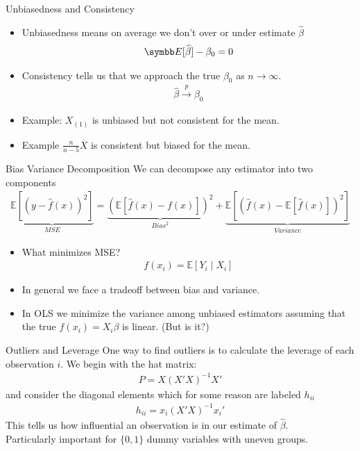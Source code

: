 \documentclass[aspectratio=169,11pt]{beamer}
\begin{document}
\begin{frame}{Unbiasedness and Consistency}
\begin{itemize}
\item Unbiasedness means on average we don't over or under estimate $\widehat{\beta}$
\begin{align*}
\E[\widehat{\beta} ] - \beta_0 = 0
\end{align*}
\item Consistency tells us that we approach the true $\beta_0$ as $n \rightarrow \infty$.
\begin{align*}
\widehat{\beta}  \overset{p}{\to} \beta_0
\end{align*}
\item Example: $X_{(1)}$ is unbiased but not consistent for the mean.
\item Example $\frac{n}{n-5} \overline{X}$ is consistent but biased for the mean.
\end{itemize}
\end{frame}


\begin{frame}{Bias Variance Decomposition}
We can decompose any estimator into two components
\begin{eqnarray*}
\underbrace{\mathbb{E}[(y- \hat{f}(x))^2]}_{MSE} =\underbrace{\left( \mathbb{E}[ \hat{f}(x) - f(x)] \right)^2}_{Bias^2}  +  \underbrace{\mathbb{E} \left[ \left(  \hat{f}(x) - \mathbb{E}[\hat{f}(x)]  \right)^2 \right]}_{Variance} 
\end{eqnarray*}
\begin{itemize}
\item What minimizes MSE?
\begin{eqnarray*}
f(x_i) = \mathbb{E}[Y_i \mid X_i]  
\end{eqnarray*}
\item In general we face a tradeoff between bias and variance.
\item In OLS we minimize the variance among unbiased estimators assuming that the true $f(x_i)= X_i \beta$ is linear. (But is it?)
\end{itemize}
\end{frame}



\begin{frame}{Outliers and Leverage}
One way to find \alert{outliers} is to calculate the \alert{leverage} of each observation $i$. We begin with the \alert{hat matrix}:
\begin{align*}
P = X  (X'X)^{-1} X'
\end{align*}
and consider the diagonal elements which for some reason are labeled $h_{ii}$
\begin{align*}
h_{ii} = x_i (X'X)^{-1} x_i'
\end{align*}
This tells us how \alert{influential} an observation is in our estimate of $\widehat{\beta}$.\\
Particularly important for $\{0,1\}$ \alert{dummy variables} with uneven groups.
\end{frame}
\end{document}
